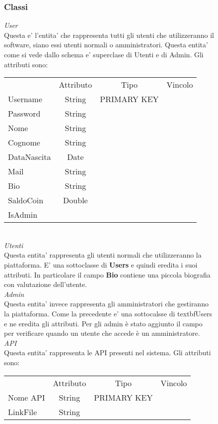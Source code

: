 {{\begin{figure}[ht]
			\subsubsection{Classi}
			\textit{User}\\
			Questa e' l'entita' che rappresenta tutti gli utenti che utilizzeranno il software, siano essi utenti normali o amministratori. Questa entita' come si vede dallo schema e' superclase di Utenti e di Admin. Gli attributi sono: 
			\begin{center}
			\begin{tabular}{lccc}
				&Attributo&Tipo&Vincolo\\
				Username&String&PRIMARY KEY\\
				Password&String& \\
				Nome&String& \\
				Cognome&String& \\
				DataNascita&Date& \\
				Mail&String& \\
				Bio&String& \\
				SaldoCoin&Double& \\
				IsAdmin\\
			\end{tabular}
			\end{center} \\
			\textit{Utenti}\\
			Questa entita' rappresenta gli utenti normali che utilizzeranno la piattaforma. E' una sottoclasse di \textbf{Users} e quindi eredita i suoi attributi. In particolare il campo \textbf{Bio} contiene una piccola biografia con valutazione dell'utente.  \\
			\textit{Admin}\\
			Questa entita' invece rappresenta gli amministratori che gestiranno la piattaforma. Come la precedente e' una sottocalsse di textbf{Users} e ne eredita gli attributi. Per gli admin è stato aggiunto il campo  per verificare quando un utente che accede è un amministratore. \\
			\textit{API}\\
			Questa entita' rappresenta le API presenti nel sistema. Gli attributi sono:
			\begin{center}
			\begin{tabular}{lccc}
				&Attributo&Tipo&Vincolo\\
				Nome API&String&PRIMARY KEY\\
				LinkFile&String& \\

\end{tabular}
\end{center}
\end{figure}}}
